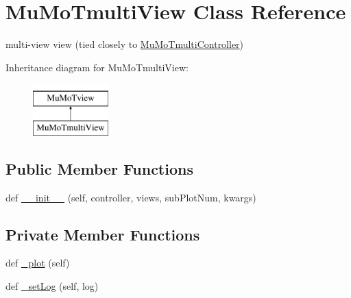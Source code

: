 \hypertarget{class_mu_mo_t_1_1_mu_mo_tmulti_view}{}\section{Mu\+Mo\+Tmulti\+View Class Reference}
\label{class_mu_mo_t_1_1_mu_mo_tmulti_view}


multi-\/view view (tied closely to \hyperlink{class_mu_mo_t_1_1_mu_mo_tmulti_controller}{Mu\+Mo\+Tmulti\+Controller})  


Inheritance diagram for Mu\+Mo\+Tmulti\+View\+:\begin{figure}[H]
\begin{center}
\leavevmode
\includegraphics[height=2.000000cm]{class_mu_mo_t_1_1_mu_mo_tmulti_view}
\end{center}
\end{figure}
\subsection*{Public Member Functions}
\begin{DoxyCompactItemize}
\item 
def \hyperlink{class_mu_mo_t_1_1_mu_mo_tmulti_view_aa355c85c06db29c1df7b6505493d5354}{\+\_\+\+\_\+init\+\_\+\+\_\+} (self, controller, views, sub\+Plot\+Num, kwargs)
\end{DoxyCompactItemize}
\subsection*{Private Member Functions}
\begin{DoxyCompactItemize}
\item 
def \hyperlink{class_mu_mo_t_1_1_mu_mo_tmulti_view_aaff21bb2a6ebdaed50f2f2fb67d0bf5c}{\+\_\+plot} (self)
\item 
def \hyperlink{class_mu_mo_t_1_1_mu_mo_tmulti_view_abfc1e19ed53c088799d1f499bc010f7f}{\+\_\+set\+Log} (self, log)
\end{DoxyCompactItemize}
